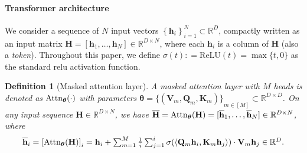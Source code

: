 \documentclass[10pt]{article}
\newtheorem{definition}[theorem]{Definition}
\renewcommand{\bar}{\overline}
\newcommand{\<}{\left\langle}
\renewcommand{\>}{\right\rangle}
\renewcommand{\bQ}{\mathbf{Q}}
\newcommand{\relu}{\mathrm{ReLU}}
\newenvironment{talign}
 {\let\displaystyle\textstyle\align}
 {\endalign}
\newcommand{\sursf}{\sigma}
\newcommand{\Attn}{{\rm Attn}}
\newcommand{\barsig}{\sigma}
\newcommand{\MSK}{{\rm MSK}}
\newcommand{\paren}[1]{{\left( #1 \right)}}
\newcommand{\brac}[1]{{\left[ #1 \right]}}
\newcommand{\set}[1]{{\left\{ #1 \right\}}}
\newcommand{\sets}[1]{{\{ #1 \}}}
\newcommand{\defeq}{\mathrel{\mathop:}=}
\newcommand{\R}{\mathbb{R}}
\newcommand{\piPS}{\pi^{\sf PS}}
\newcommand{\piPSf}{\pi^{\sf PSfull}}
\def\bH{{\mathbf H}}
\def\bK{{\mathbf K}}
\def\bQ{{\mathbf Q}}
\def\bV{{\mathbf V}}
\def\btheta{{\boldsymbol \theta}}
\def\bh{{\mathbf h}}
\newcommand{\authnote}[2]{{\scriptsize $\ll$\textsf{#1 notes: #2}$\gg$}}
\newcommand{\authnote}[2]{}
\newcommand{\lc}[1]{{\color{blue}\authnote{Licong}{#1}}}
\begin{document}

\paragraph{Transformer architecture} We consider a sequence of $N$ input vectors $\set{\bh_i}_{i=1}^N\subset \R^D$, compactly written as an input matrix $\bH=[\bh_1,\dots,\bh_N]\in \R^{D\times N}$, where each $\bh_i$ is a column of $\bH$ (also a \emph{token}). Throughout this paper, we define $\sigma(t)\defeq \relu(t)=\max\sets{t,0}$ as the standard relu activation function. %



\begin{definition}[Masked attention layer]
\label{def:masked-attention}
A masked attention layer with $M$ heads is denoted as $\Attn_{\btheta}(\cdot)$ with parameters $\btheta=\sets{ (\bV_m,\bQ_m,\bK_m)}_{m\in[M]}\subset \R^{D\times D}$. On any input sequence $\bH\in\R^{D\times N}$, we have $\bar{\bH} = \Attn_{\btheta}(\bH) = [\bar{\bh}_1, \ldots, \bar{\bh}_N] \in \R^{D \times N}$, where
\begin{align*}
\textstyle    \bar{\bh}_i = \brac{\Attn_{\btheta}(\bH)}_i = \bh_i + \sum_{m=1}^M \frac{1}{i}\sum_{j=1}^i \barsig\paren{ \<\bQ_m\bh_i, \bK_m\bh_j\> }\cdot \bV_m\bh_j \in \R^D.
\end{align*}
\end{definition}
\end{document}
